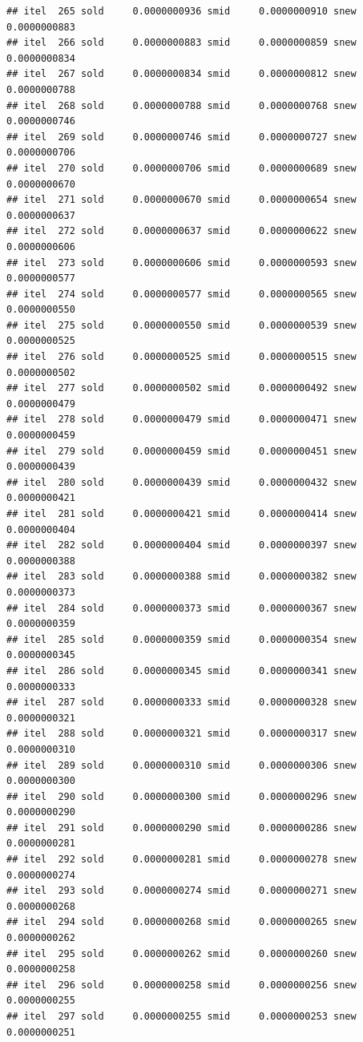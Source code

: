 \documentclass[
  12pt,
]{article}
\begin{document}
\begin{verbatim}
## itel  265 sold     0.0000000936 smid     0.0000000910 snew     0.0000000883 
## itel  266 sold     0.0000000883 smid     0.0000000859 snew     0.0000000834 
## itel  267 sold     0.0000000834 smid     0.0000000812 snew     0.0000000788 
## itel  268 sold     0.0000000788 smid     0.0000000768 snew     0.0000000746 
## itel  269 sold     0.0000000746 smid     0.0000000727 snew     0.0000000706 
## itel  270 sold     0.0000000706 smid     0.0000000689 snew     0.0000000670 
## itel  271 sold     0.0000000670 smid     0.0000000654 snew     0.0000000637 
## itel  272 sold     0.0000000637 smid     0.0000000622 snew     0.0000000606 
## itel  273 sold     0.0000000606 smid     0.0000000593 snew     0.0000000577 
## itel  274 sold     0.0000000577 smid     0.0000000565 snew     0.0000000550 
## itel  275 sold     0.0000000550 smid     0.0000000539 snew     0.0000000525 
## itel  276 sold     0.0000000525 smid     0.0000000515 snew     0.0000000502 
## itel  277 sold     0.0000000502 smid     0.0000000492 snew     0.0000000479 
## itel  278 sold     0.0000000479 smid     0.0000000471 snew     0.0000000459 
## itel  279 sold     0.0000000459 smid     0.0000000451 snew     0.0000000439 
## itel  280 sold     0.0000000439 smid     0.0000000432 snew     0.0000000421 
## itel  281 sold     0.0000000421 smid     0.0000000414 snew     0.0000000404 
## itel  282 sold     0.0000000404 smid     0.0000000397 snew     0.0000000388 
## itel  283 sold     0.0000000388 smid     0.0000000382 snew     0.0000000373 
## itel  284 sold     0.0000000373 smid     0.0000000367 snew     0.0000000359 
## itel  285 sold     0.0000000359 smid     0.0000000354 snew     0.0000000345 
## itel  286 sold     0.0000000345 smid     0.0000000341 snew     0.0000000333 
## itel  287 sold     0.0000000333 smid     0.0000000328 snew     0.0000000321 
## itel  288 sold     0.0000000321 smid     0.0000000317 snew     0.0000000310 
## itel  289 sold     0.0000000310 smid     0.0000000306 snew     0.0000000300 
## itel  290 sold     0.0000000300 smid     0.0000000296 snew     0.0000000290 
## itel  291 sold     0.0000000290 smid     0.0000000286 snew     0.0000000281 
## itel  292 sold     0.0000000281 smid     0.0000000278 snew     0.0000000274 
## itel  293 sold     0.0000000274 smid     0.0000000271 snew     0.0000000268 
## itel  294 sold     0.0000000268 smid     0.0000000265 snew     0.0000000262 
## itel  295 sold     0.0000000262 smid     0.0000000260 snew     0.0000000258 
## itel  296 sold     0.0000000258 smid     0.0000000256 snew     0.0000000255 
## itel  297 sold     0.0000000255 smid     0.0000000253 snew     0.0000000251 

\end{verbatim}
\end{document}

